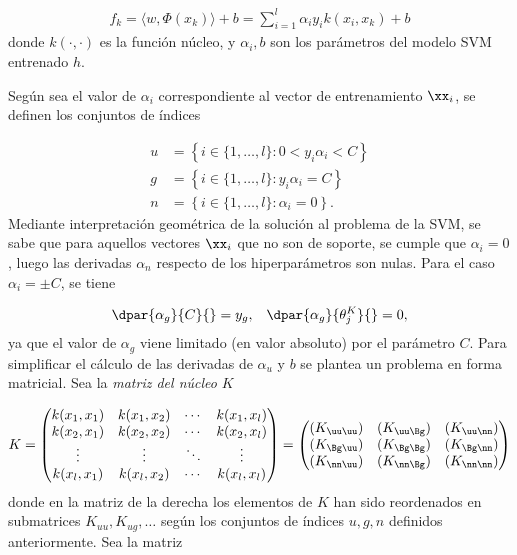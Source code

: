 \begin{align}
  f_k = \langle w,\Phi(x_k)\rangle+b = \sum_{i=1}^l \alpha_i y_i k(x_i,x_k) + b
  \label{fk}
\end{align}
donde $k(\cdot,\cdot)$ es la función núcleo, y $\alpha_i, b$ son los
parámetros del modelo SVM entrenado $h$.

Según sea el valor de $\alpha_i$ correspondiente al vector de
entrenamiento $\xx_i$, se definen los conjuntos de índices

\begin{align}
  \label{unbounded-sv-set}
  u &= \left\{i\in\{1,\ldots,l\}:0<y_i\alpha_i<C \right\}\\
  \label{bounded-sv-set}
  g &= \left\{i\in\{1,\ldots,l\}: y_i\alpha_i=C \right\}\\
  n &= \left\{i\in\{1,\ldots,l\}: \alpha_i=0 \right\}.
\end{align}
Mediante interpretación geométrica de la solución al problema de la
SVM, se sabe que para aquellos vectores $\xx_i$ que no son de soporte,
se cumple que $\alpha_i=0$, luego las derivadas $\alpha_n$ respecto de los
hiperparámetros son nulas. Para el caso $\alpha_i=\pm{}C$, se tiene

\begin{align}
  \dpar{\alpha_g}{C}{} = y_g, && \dpar{\alpha_g}{{\theta}^K_j}{} = 0,
\end{align}
ya que el valor de $\alpha_g$ viene limitado (en valor absoluto) por el
parámetro $C$. Para simplificar el cálculo de las derivadas de
$\alpha_u$ y $b$ se plantea un problema en forma matricial. Sea la
\emph{matriz del núcleo} $K$

\begin{align}
  K = \begin{pmatrix} k(x_1,x_1) & k(x_1,x_2) & \cdots & k(x_1,x_l)
    \\ k(x_2,x_1) & k(x_2,x_2) & \cdots & k(x_2,x_l) \\ \vdots &
    \vdots & \ddots & \vdots \\ k(x_l,x_1) & k(x_l,x_2) & \cdots &
    k(x_l,x_l)
  \end{pmatrix}
  =
  \begin{pmatrix}
    (K_{\uu\uu}) & (K_{\uu\Bg}) & (K_{\uu\nn}) \\
    (K_{\Bg\uu}) & (K_{\Bg\Bg}) & (K_{\Bg\nn}) \\
    (K_{\nn\uu}) & (K_{\nn\Bg}) & (K_{\nn\nn})
  \end{pmatrix}
\end{align}
donde en la matriz de la derecha los elementos de $K$ han sido
reordenados en submatrices $K_{uu},K_{ug},\ldots$ según los conjuntos
de índices $u, g, n$ definidos anteriormente.  Sea la matriz

